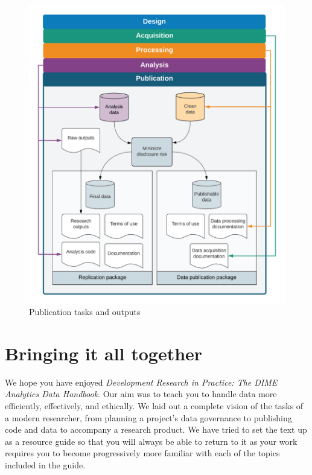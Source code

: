 \documentclass[
]{book}
\begin{document}
\begin{figure}
\includegraphics[width=28.12in]{diagrams/Publication} \caption{Publication tasks and outputs}\label{fig:unnamed-chunk-48}
\end{figure}

\hypertarget{bringing-it-all-together}{%
\chapter{Bringing it all together}\label{bringing-it-all-together}}

We hope you have enjoyed \emph{Development Research in Practice: The DIME Analytics Data Handbook}.
Our aim was to teach you to handle data more efficiently, effectively, and ethically.
We laid out a complete vision of the tasks of a modern researcher,
from planning a project's data governance to publishing code and data
to accompany a research product.
We have tried to set the text up as a resource guide
so that you will always be able to return to it
as your work requires you to become progressively more familiar
with each of the topics included in the guide.
\end{document}

